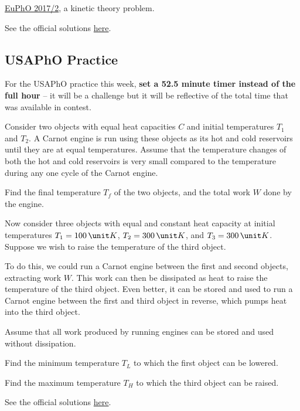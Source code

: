 \documentclass[11pt]{scrartcl}
\newcommand{\officialsol}[1]{See the official solutions \href{#1}{here}.}
\begin{document}
\begin{prob}
    \href{https://eupho.ee/wp-content/uploads/2020/07/EuPhO17_theory.pdf}{EuPhO 2017/2}, a kinetic theory problem.
\end{prob}
\begin{sol}
    \officialsol{https://eupho.ee/wp-content/uploads/2020/07/EuPhO17_theory_solution_marking.pdf}
\end{sol}

\subsection{USAPhO Practice}

For the USAPhO practice this week, \textbf{set a 52.5 minute timer instead of the full hour} -- it will be a challenge but it will be reflective of the total time that was available in contest.

\begin{prob}[USAPhO 2017/A2]
    Consider two objects with equal heat capacities $C$ and initial temperatures $T_1$ and $T_2$. A Carnot
engine is run using these objects as its hot and cold reservoirs until they are at equal temperatures.
Assume that the temperature changes of both the hot and cold reservoirs is very small compared
to the temperature during any one cycle of the Carnot engine.
\begin{anum}
    \item Find the final temperature $T_f$ of the two objects, and the total work $W$ done by the engine.
\end{anum}
Now consider three objects with equal and constant heat capacity at initial temperatures
$T_1 = 100\,\unit K$, $T_2 = 300 \, \unit K$, and $T_3 = 300\,\unit K$. Suppose we wish to raise the temperature of the
third object.

To do this, we could run a Carnot engine between the first and second objects, extracting work
$W$. This work can then be dissipated as heat to raise the temperature of the third object. Even
better, it can be stored and used to run a Carnot engine between the first and third object in
reverse, which pumps heat into the third object.

Assume that all work produced by running engines can be stored and used without dissipation.
\begin{anum}
    \item [(b)] Find the minimum temperature $T_L$ to which the first object can be lowered.
    \item [(c)] Find the maximum temperature $T_H$ to which the third object can be raised.
\end{anum}
\end{prob}
\begin{sol}
    \officialsol{https://aapt.org/physicsteam/2019/upload/USAPhO-2017-Solutions.pdf\#page=4}
\end{sol}
\end{document}
